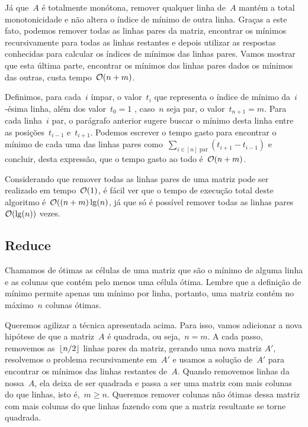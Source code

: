 Já que~$A$ é totalmente monótona, remover qualquer linha de~$A$ mantém a total monotonicidade e não altera o índice de mínimo de outra linha. Graças a este fato, podemos remover todas as linhas pares da matriz, encontrar os mínimos recursivamente para todas as linhas restantes e depois utilizar as respostas conhecidas para calcular os índices de mínimos das linhas pares. Vamos mostrar que esta última parte, encontrar os mínimos das linhas pares dados os mínimos das outras, custa tempo~$\mathcal{O}(n+m)$.

Definimos, para cada~$i$ ímpar, o valor~$t_i$ que representa o índice de mínimo da~$i$-ésima linha, além dos valor~${ t_0 = 1 }$ , caso~$n$ seja par, o valor~${ t_{n+1} = m }$. Para cada linha~$i$ par, o parágrafo anterior sugere buscar o mínimo desta linha entre as posições~$t_{i-1}$ e~$t_{i+1}$. Podemos escrever o tempo gasto para encontrar o mínimo de cada uma das linhas pares como~${ \sum\limits_{ i \in [n] \text{ par} }( t_{i+1} - t_{i-1} ) }$ e concluir, desta expressão, que o tempo gasto ao todo é~$\mathcal{O}(n+m)$. 

Considerando que remover todas as linhas pares de uma matriz pode ser realizado em tempo~$\mathcal{O}(1)$, é fácil ver que o tempo de execução total deste algoritmo é~$\mathcal{O}((n+m)\lg(n)$, já que só é possível remover todas as linhas pares~$\mathcal{O}(\lg(n))$ vezes.


\subsection{Reduce} \label{SMAWK:reduce}
Chamamos de ótimas as células de uma matriz que são o mínimo de alguma linha e as colunas que contém pelo menos uma célula ótima. Lembre que a definição de mínimo permite apenas um mínimo por linha, portanto, uma matriz contém no máximo~$n$ colunas ótimas.

Queremos agilizar a técnica apresentada acima. Para isso, vamos adicionar a nova hipótese de que a matriz~$A$ é quadrada, ou seja,~$n = m$. A cada passo, removemos as~$\lfloor n/2\rfloor$ linhas pares da matriz, gerando uma nova matriz $A'$, resolvemos o problema recursivamente em~$A'$ e usamos a solução de~$A'$ para encontrar os mínimos das linhas restantes de~$A$. Quando removemos linhas da nossa~$A$, ela deixa de ser quadrada e passa a ser uma matriz com mais colunas do que linhas, isto é,~$m \geq n$. Queremos remover colunas não ótimas dessa matriz com mais colunas do que linhas fazendo com que a matriz resultante se torne quadrada.  

